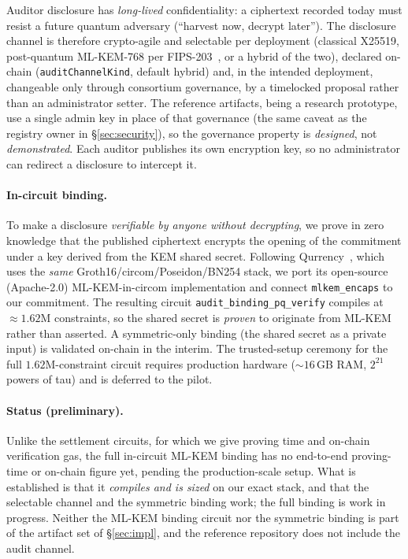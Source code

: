 \documentclass[11pt]{article}
\newcommand{\code}[1]{\texttt{#1}}
\begin{document}
Auditor disclosure has \emph{long-lived} confidentiality: a ciphertext recorded
today must resist a future quantum adversary (``harvest now, decrypt later'').
The disclosure channel is therefore crypto-agile and selectable per deployment
(classical X25519, post-quantum ML-KEM-768 per FIPS-203~\cite{mlkem}, or a hybrid
of the two), declared on-chain (\code{auditChannelKind}, default hybrid) and, in
the intended deployment, changeable only through consortium governance, by a
timelocked proposal rather than an administrator setter. The reference
artifacts, being a research prototype, use a single admin key in place of that
governance (the same caveat as the registry owner in \S\ref{sec:security}), so
the governance property is \emph{designed}, not \emph{demonstrated}. Each
auditor publishes its own encryption key, so no administrator can redirect a
disclosure to intercept it.

\paragraph{In-circuit binding.}
To make a disclosure \emph{verifiable by anyone without decrypting}, we prove in
zero knowledge that the published ciphertext encrypts the opening of the
commitment under a key derived from the KEM shared secret. Following
Qurrency~\cite{qurrency}, which uses the \emph{same}
Groth16/circom/Poseidon/BN254 stack, we port its open-source (Apache-2.0)
ML-KEM-in-circom implementation and connect \code{mlkem\_encaps} to our
commitment. The resulting circuit \code{audit\_binding\_pq\_verify} compiles at
$\approx 1.62$M constraints, so the shared secret is \emph{proven} to originate
from ML-KEM rather than asserted. A symmetric-only binding (the shared secret as
a private input) is validated on-chain in the interim. The trusted-setup
ceremony for the full $1.62$M-constraint circuit requires production hardware
($\sim 16$\,GB RAM, $2^{21}$ powers of tau) and is deferred to the pilot.

\paragraph{Status (preliminary).}
Unlike the settlement circuits, for which we give proving time and on-chain
verification gas, the full in-circuit ML-KEM binding has no end-to-end
proving-time or on-chain figure yet, pending the production-scale setup. What is
established is that it \emph{compiles and is sized} on our exact stack, and that
the selectable channel and the symmetric binding work; the full binding is work
in progress. Neither the ML-KEM binding circuit nor the symmetric binding is part
of the artifact set of \S\ref{sec:impl}, and the reference repository does not
include the audit channel.
\end{document}
